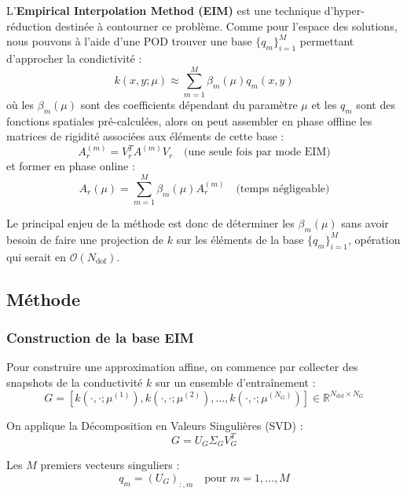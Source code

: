 \documentclass[12pt,a4paper]{article}
\begin{document}
L'\textbf{Empirical Interpolation Method (EIM)} est une technique d'hyper-réduction destinée à contourner ce problème.
Comme pour l'espace des solutions, nous pouvons à l'aide d'une POD trouver une base $\{q_m\}_{i=1}^{M}$ permettant d'approcher la condictivité :
\begin{equation*}
k(x, y; \mu) \approx \sum_{m=1}^{M} \beta_m(\mu) q_m(x, y)
\end{equation*}
où les $\beta_m(\mu)$ sont des coefficients dépendant du paramètre $\mu$ et les $q_m$ sont des fonctions spatiales pré-calculées, alors on peut assembler en phase offline les matrices de rigidité associées aux éléments de cette base :
\begin{equation*}
A_r^{(m)} = V_r^T A^{(m)} V_r \quad \text{(une seule fois par mode EIM)}
\end{equation*}
et former en phase online :
\begin{equation*}
A_r(\mu) = \sum_{m=1}^{M} \beta_m(\mu) A_r^{(m)} \quad \text{(temps négligeable)}
\end{equation*}

Le principal enjeu de la méthode est donc de déterminer les $\beta_m(\mu)$ sans avoir besoin de faire une projection de $k$ sur les éléments de la base $\{q_m\}_{i=1}^{M}$, opération qui serait en $\mathcal{O}(N_{\text{dof}})$.

\subsection{Méthode} \label{sec:eim_methode}

\subsubsection{Construction de la base EIM}

Pour construire une approximation affine, on commence par collecter des snapshots de la conductivité $k$ sur un ensemble d'entraînement :
\begin{equation*}
G = [k(\cdot, \cdot; \mu^{(1)}), k(\cdot, \cdot; \mu^{(2)}), \ldots, k(\cdot, \cdot; \mu^{(N_G)})] \in \mathbb{R}^{N_{\text{dof}} \times N_G}
\end{equation*}

On applique la Décomposition en Valeurs Singulières (SVD) :
\begin{equation*}
G = U_G \Sigma_G V_G^T
\end{equation*}

Les $M$ premiers vecteurs singuliers :
\begin{equation*}
q_m = (U_G)_{:,m} \quad \text{pour } m = 1, \ldots, M
\end{equation*}
\end{document}

